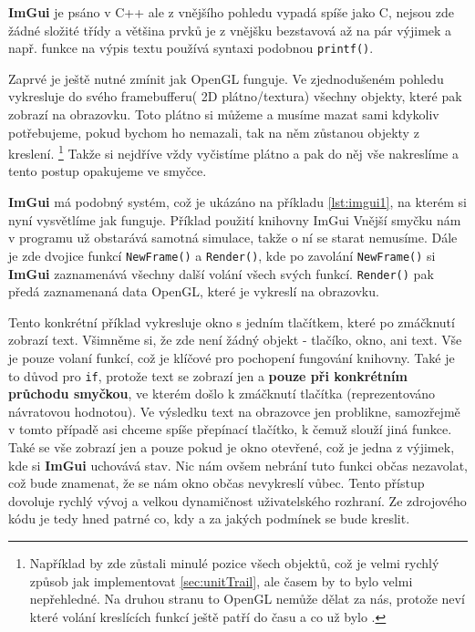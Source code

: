 \textbf{ImGui} je psáno v C++ ale z vnějšího pohledu vypadá spíše jako C, nejsou zde žádné složité třídy a většina prvků je z vnějšku bezstavová až na pár výjimek a např. funkce na výpis textu používá syntaxi podobnou \texttt{printf()}.

Zaprvé je ještě nutné zmínit jak OpenGL funguje. Ve zjednodušeném pohledu vykresluje do svého framebufferu( 2D plátno/textura) všechny objekty, které pak zobrazí na obrazovku. Toto plátno si můžeme a musíme mazat sami kdykoliv potřebujeme, pokud bychom ho nemazali, tak na něm zůstanou objekty z  kreslení.
\footnote{Například by zde zůstali minulé pozice všech objektů, což je velmi rychlý způsob jak implementovat \ref{sec:unitTrail}, ale časem by to bylo velmi nepřehledné. Na druhou stranu to OpenGL nemůže dělat za nás, protože neví které volání kreslících funkcí ještě patří do  času a co už bylo .} Takže si nejdříve vždy vyčistíme plátno a pak do něj vše nakreslíme a tento postup opakujeme ve smyčce.

\textbf{ImGui} má podobný systém, což je ukázáno na příkladu \ref{lst:imgui1}, na kterém si nyní vysvětlíme jak funguje.
{Příklad použití knihovny ImGui }
Vnější smyčku nám v programu už obstarává samotná simulace, takže o ní se starat nemusíme. Dále je zde dvojice funkcí \texttt{NewFrame()} a \texttt{Render()}, kde po zavolání \texttt{NewFrame()} si \textbf{ImGui} zaznamenává všechny další volání všech svých funkcí. \texttt{Render()} pak předá zaznamenaná data OpenGL, které je vykreslí na obrazovku. 

Tento konkrétní příklad vykresluje okno s jedním tlačítkem, které po zmáčknutí zobrazí text. Všimněme si, že zde není žádný objekt - tlačíko, okno, ani text. Vše je pouze volaní funkcí, což je klíčové pro pochopení fungování knihovny. Také je to důvod pro \texttt{if}, protože  text se zobrazí jen a \textbf{pouze při konkrétním průchodu smyčkou}, ve kterém došlo k zmáčknutí tlačítka (reprezentováno návratovou hodnotou). Ve výsledku text na obrazovce jen problikne, samozřejmě v tomto případě asi chceme spíše přepínací tlačítko, k čemuž slouží jiná funkce. Také se vše zobrazí jen a pouze pokud je okno otevřené, což je jedna z výjimek, kde si \textbf{ImGui} uchovává stav. Nic nám ovšem nebrání tuto funkci občas nezavolat, což bude znamenat, že se nám okno občas nevykreslí vůbec. Tento přístup dovoluje rychlý vývoj a velkou dynamičnost uživatelského rozhraní. Ze zdrojového kódu je tedy hned patrné co, kdy a za jakých podmínek se bude kreslit.

